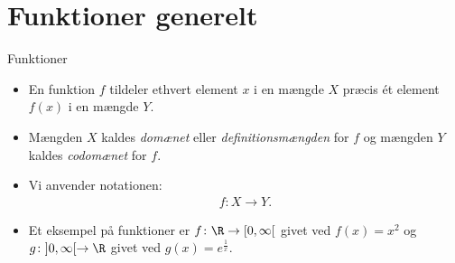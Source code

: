 \section{Funktioner generelt}
\begin{frame}{Funktioner}
\begin{itemize} 
	\setlength\itemsep{1em}
	\item<1-> En funktion $f$ tildeler ethvert element $x$ i en mængde $X$ præcis ét element $ f(x) $ i en mængde $Y$.
	\item<2-> Mængden $X$ kaldes \emph{domænet} eller \emph{definitionsmængden} for $f$ og mængden $Y$ kaldes \emph{codomænet} for $f$.
	\item<3-> Vi anvender notationen:
	\begin{align*}
	f\colon X\to Y.
	\end{align*}
	\item<4-> Et eksempel på funktioner er $f\colon \R \to [0,\infty[$ givet ved $f(x)=x^2$ og $g\colon ]0,\infty[\to \R$ givet ved $g(x)=e^{\frac{1}{x}}$.

\end{itemize}
\end{frame}

